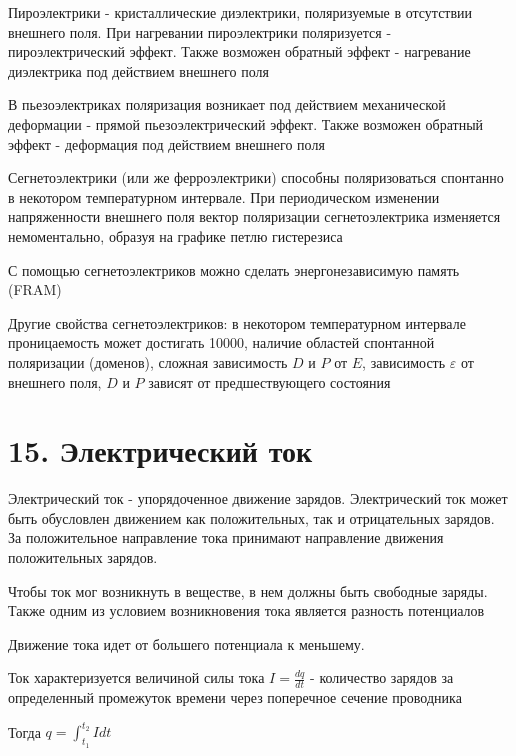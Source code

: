 \documentclass[12pt]{article}
\begin{document}
Пироэлектрики - кристаллические диэлектрики, поляризуемые в отсутствии внешнего поля. При нагревании пироэлектрики поляризуется - пироэлектрический эффект.
Также возможен обратный эффект - нагревание диэлектрика под действием внешнего поля

\mediumvspace

В пьезоэлектриках поляризация возникает под действием механической деформации - прямой пьезоэлектрический эффект. Также 
возможен обратный эффект - деформация под действием внешнего поля

\mediumvspace

Сегнетоэлектрики (или же ферроэлектрики) способны поляризоваться спонтанно в некотором температурном интервале. 
При периодическом изменении напряженности внешнего поля вектор поляризации сегнетоэлектрика изменяется немоментально, 
образуя на графике петлю гистерезиса

С помощью сегнетоэлектриков можно сделать энергонезависимую память (FRAM)

Другие свойства сегнетоэлектриков: в некотором температурном интервале проницаемость может достигать 10000, наличие областей спонтанной поляризации (доменов), 
сложная зависимость $D$ и $P$ от $E$, зависимость $\varepsilon$ от внешнего поля, $D$ и $P$ зависят от предшествующего состояния







\section{15. Электрический ток}

\Def Электрический ток - упорядоченное движение зарядов. Электрический ток может быть обусловлен движением как положительных, так и отрицательных зарядов.
За положительное направление тока принимают направление движения положительных зарядов.

Чтобы ток мог возникнуть в веществе, в нем должны быть свободные заряды. Также одним из условием возникновения тока является разность потенциалов

Движение тока идет от большего потенциала к меньшему.

Ток характеризуется величиной силы тока $I = \frac{dq}{dt}$ - количество зарядов за определенный промежуток времени через поперечное сечение проводника

Тогда $q = \int_{t_1}^{t_2} Idt$
\end{document}
